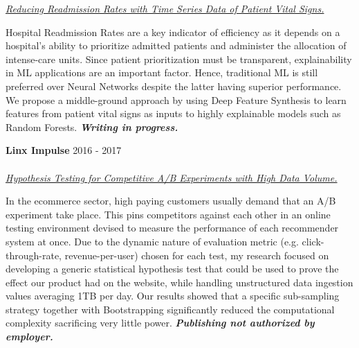 \documentclass[margin, line]{res}
\begin{document}
\begin{resume}
\underline{\sl Reducing Readmission Rates with Time Series Data of Patient Vital Signs.}\\
\begin{small}
    Hospital Readmission Rates are a key indicator of efficiency as it depends on a hospital's ability to prioritize admitted patients and administer the allocation of intense-care units. Since patient prioritization must be transparent, explainability in ML applications are an important factor. Hence, traditional ML is still preferred over Neural Networks despite the latter having superior performance. We propose a middle-ground approach by using Deep Feature Synthesis to learn features from patient vital signs as inputs to highly explainable models such as Random Forests. {\sl \textbf{Writing in progress.}}
\end{small}

\textbf{Linx Impulse} \hfill 2016 - 2017\\
\\
\underline{\sl Hypothesis Testing for Competitive A/B Experiments with High Data Volume.}\\
\begin{small}
    In the ecommerce sector, high paying customers usually demand that an A/B experiment take place. This pins competitors against each other in an online testing environment devised to measure the performance of each recommender system at once. Due to the dynamic nature of evaluation metric (e.g. click-through-rate, revenue-per-user) chosen for each test, my research focused on developing a generic statistical hypothesis test that could be used to prove the effect our product had on the website, while handling unstructured data ingestion values averaging 1TB per day. Our results showed that a specific sub-sampling strategy together with Bootstrapping significantly reduced the computational complexity sacrificing very little power. {\sl \textbf{Publishing not authorized by employer.}}
\end{small}


\end{resume}
\end{document}
